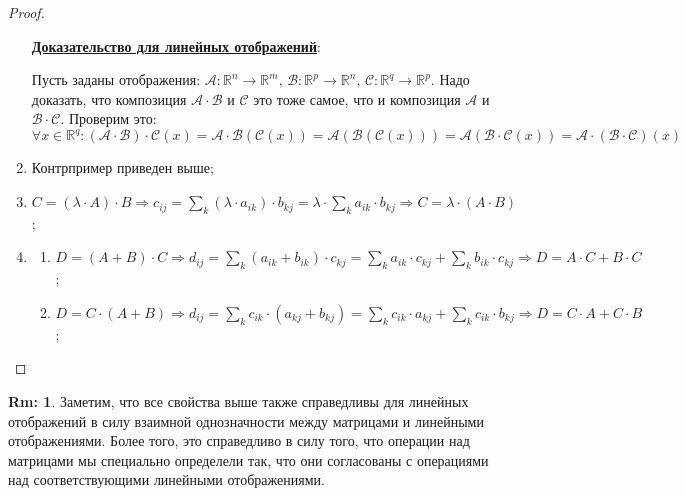 \documentclass[12pt]{article}
\newcommand{\MR}{\mathbb{R}}
\newcommand{\MA}{\mathcal{A}}
\newcommand{\MCB}{\mathcal{B}}
\newcommand{\MCC}{\mathcal{C}}
\theoremstyle{definition}
\newtheorem{rem}{Rm:}
\newcommand{\ddsum}[2]{\displaystyle\sum\limits_{#1}^{#2}}
\begin{document}
\begin{proof}
\begin{enumerate}[label=(\arabic*)]
		\uline{\textbf{Доказательство для линейных отображений}}:
		
		Пусть заданы отображения: $\MA \colon \MR^n \to \MR^m, \, \MCB \colon \MR^p \to \MR^n, \, \MCC \colon \MR^q \to \MR^p$. Надо доказать, что композиция $\MA{\cdot}\MCB$ и $\MCC$ это тоже самое, что и композиция $\MA$ и $\MCB{\cdot}\MCC$. Проверим это:
		$$
			\forall x \in \MR^q \colon (\MA{\cdot}\MCB){\cdot}\MCC(x) = \MA{\cdot}\MCB(\MCC(x)) = \MA(\MCB(\MCC(x))) = \MA(\MCB{\cdot}\MCC(x)) = \MA{\cdot}(\MCB{\cdot}\MCC)(x)
		$$
		\item Контрпример приведен выше;
		\item $C = (\lambda{\cdot}A){\cdot}B \Rightarrow c_{ij} = \ddsum{k}{} (\lambda{\cdot}a_{ik}){\cdot}b_{kj} = \lambda{\cdot}\ddsum{k}{}a_{ik}{\cdot}b_{kj} \Rightarrow C = \lambda{\cdot}(A{\cdot}B)$;
		\item \hfill
		\begin{enumerate}
			\item $D =(A + B){\cdot}C \Rightarrow d_{ij} = \ddsum{k}{}(a_{ik} + b_{ik}){\cdot}c_{kj} = \ddsum{k}{}a_{ik}{\cdot}c_{kj} + \ddsum{k}{}b_{ik}{\cdot}c_{kj} \Rightarrow D = A{\cdot}C + B{\cdot}C$;
			\item $D = C{\cdot}(A + B) \Rightarrow d_{ij} = \ddsum{k}{}c_{ik}{\cdot}(a_{kj} + b_{kj}) = \ddsum{k}{}c_{ik}{\cdot}a_{kj} + \ddsum{k}{}c_{ik}{\cdot}b_{kj} \Rightarrow D = C{\cdot}A + C{\cdot}B$;
		\end{enumerate}
	\end{enumerate}
\end{proof}
\begin{rem}
	Заметим, что все свойства выше также справедливы для линейных отображений в силу взаимной однозначности между матрицами и линейными отображениями. Более того, это справедливо в силу того, что операции над матрицами мы специально определели так, что они согласованы с операциями над соответствующими линейными отображениями.
\end{rem}
\end{document}

